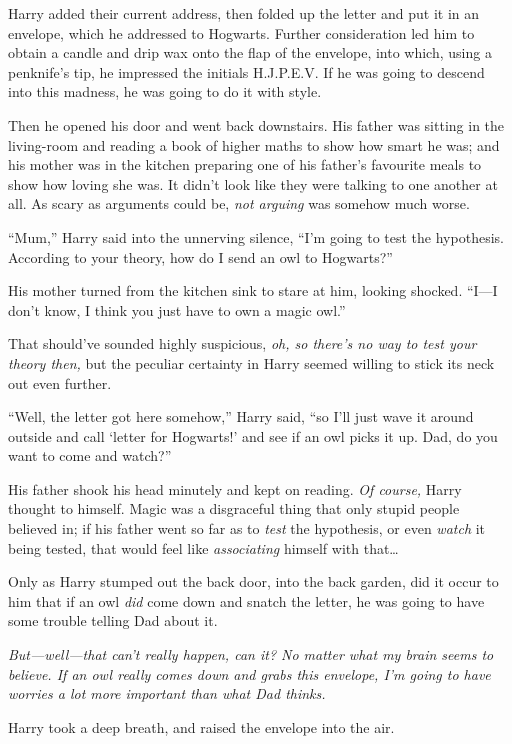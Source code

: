 Harry added their current address, then folded up the letter and put it in an envelope, which he addressed to Hogwarts. Further consideration led him to obtain a candle and drip wax onto the flap of the envelope, into which, using a penknife’s tip, he impressed the initials H.J.P.E.V\@. If he was going to descend into this madness, he was going to do it with style.

Then he opened his door and went back downstairs. His father was sitting in the living-room and reading a book of higher maths to show how smart he was; and his mother was in the kitchen preparing one of his father’s favourite meals to show how loving she was. It didn’t look like they were talking to one another at all. As scary as arguments could be, \emph{not arguing} was somehow much worse.

“Mum,” Harry said into the unnerving silence, “I’m going to test the hypothesis. According to your theory, how do I send an owl to Hogwarts?”

His mother turned from the kitchen sink to stare at him, looking shocked. “I—I don’t know, I think you just have to own a magic owl.”

That should’ve sounded highly suspicious, \emph{oh, so there’s no way to test your theory then,} but the peculiar certainty in Harry seemed willing to stick its neck out even further.

“Well, the letter got here somehow,” Harry said, “so I’ll just wave it around outside and call ‘letter for Hogwarts!’ and see if an owl picks it up. Dad, do you want to come and watch?”

His father shook his head minutely and kept on reading. \emph{Of course,} Harry thought to himself. Magic was a disgraceful thing that only stupid people believed in; if his father went so far as to \emph{test} the hypothesis, or even \emph{watch} it being tested, that would feel like \emph{associating} himself with that…

Only as Harry stumped out the back door, into the back garden, did it occur to him that if an owl \emph{did} come down and snatch the letter, he was going to have some trouble telling Dad about it.

\emph{But—well—that can’t \emph{really} happen, can it? No matter what my brain seems to believe. If an owl really comes down and grabs this envelope, I’m going to have worries a lot more important than what Dad thinks.}

Harry took a deep breath, and raised the envelope into the air.


